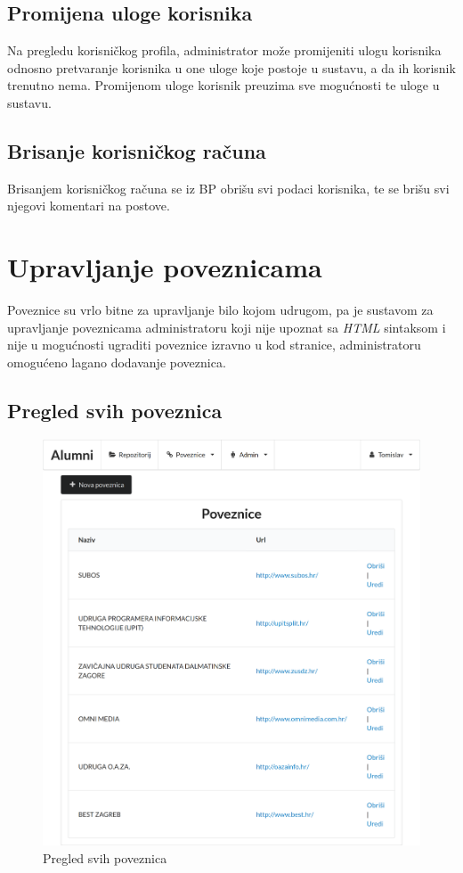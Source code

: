 \documentclass[zavrsni, numeric]{fer}
\begin{document}
\subsection{Promijena uloge korisnika}
Na pregledu korisničkog profila, administrator može promijeniti ulogu korisnika odnosno pretvaranje korisnika u one uloge koje postoje u sustavu, a da ih korisnik trenutno nema. Promijenom uloge korisnik preuzima sve mogućnosti te uloge u sustavu.

\subsection{Brisanje korisničkog računa}
Brisanjem korisničkog računa se iz BP obrišu svi podaci korisnika, te se brišu svi njegovi komentari na postove.

\section{Upravljanje poveznicama}
Poveznice su vrlo bitne za upravljanje bilo kojom udrugom, pa je sustavom za upravljanje poveznicama administratoru koji nije upoznat sa \textit{HTML} sintaksom i nije u mogućnosti ugraditi poveznice izravno u kod stranice, administratoru omogućeno lagano dodavanje poveznica.

\subsection{Pregled svih poveznica}

\begin{figure}[H]
	\centering
	\includegraphics[width=13cm]{slike/poveznice.png}
	\caption{Pregled svih poveznica}
	\label{fig:poveznice}
\end{figure}
\end{document}
